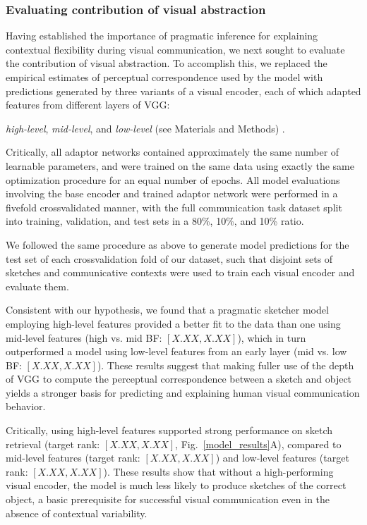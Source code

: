 \documentclass[9pt,twocolumn,twoside]{pnas-new}
\begin{document}
\subsubsection*{Evaluating contribution of visual abstraction}

Having established the importance of pragmatic inference for explaining contextual flexibility during visual communication, we next sought to evaluate the contribution of visual abstraction.
To accomplish this, we replaced the empirical estimates of perceptual correspondence used by the model with predictions generated by three variants of a visual encoder, each of which adapted features from different layers of VGG: 

\textit{high-level}, \textit{mid-level}, and \textit{low-level} (see Materials and Methods) .

Critically, all adaptor networks contained approximately the same number of learnable parameters, and were trained on the same data using exactly the same optimization procedure for an equal number of epochs. 
All model evaluations involving the base encoder and trained adaptor network were performed in a fivefold crossvalidated manner, with the full communication task dataset split into training, validation, and test sets in a 80\%, 10\%, and 10\% ratio. 

We followed the same procedure as above to generate model predictions for the test set of each crossvalidation fold of our dataset, such that disjoint sets of sketches and communicative contexts were used to train each visual encoder and evaluate them.
 

Consistent with our hypothesis, we found that a pragmatic sketcher model employing high-level features provided a better fit to the data than one using mid-level features (high vs. mid BF: $[X.XX, X.XX]$), which in turn outperformed a model using low-level features from an early layer (mid vs. low BF: $[X.XX, X.XX]$). 
These results suggest that making fuller use of the depth of VGG to compute the perceptual correspondence between a sketch and object yields a stronger basis for predicting and explaining human visual communication behavior.

Critically, using high-level features supported strong performance on sketch retrieval (target rank: $[X.XX, X.XX]$, Fig.~\ref{model_results}A), compared to mid-level features (target rank: $[X.XX, X.XX]$) and low-level features (target rank: $[X.XX, X.XX]$). 
These results show that without a high-performing visual encoder, the model is much less likely to produce sketches of the correct object, a basic prerequisite for successful visual communication even in the absence of contextual variability. 
\end{document}
